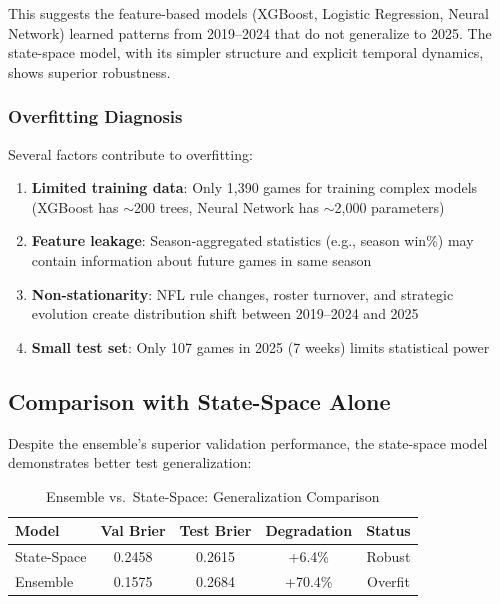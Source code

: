 This suggests the feature-based models (XGBoost, Logistic Regression, Neural Network) learned patterns from 2019--2024 that do not generalize to 2025. The state-space model, with its simpler structure and explicit temporal dynamics, shows superior robustness.

\subsubsection{Overfitting Diagnosis}

Several factors contribute to overfitting:

\begin{enumerate}
    \item \textbf{Limited training data}: Only 1,390 games for training complex models (XGBoost has $\sim$200 trees, Neural Network has $\sim$2,000 parameters)
    \item \textbf{Feature leakage}: Season-aggregated statistics (e.g., season win\%) may contain information about future games in same season
    \item \textbf{Non-stationarity}: NFL rule changes, roster turnover, and strategic evolution create distribution shift between 2019--2024 and 2025
    \item \textbf{Small test set}: Only 107 games in 2025 (7 weeks) limits statistical power
\end{enumerate}

\subsection{Comparison with State-Space Alone}

Despite the ensemble's superior validation performance, the state-space model demonstrates better test generalization:

\begin{table}[htbp]
\centering
\caption{Ensemble vs.\ State-Space: Generalization Comparison}
\label{tab:ensemble-vs-state-space-generalization}
\begin{tabular}{lcccc}
\toprule
\textbf{Model} & \textbf{Val Brier} & \textbf{Test Brier} & \textbf{Degradation} & \textbf{Status} \\
\midrule
State-Space & 0.2458 & 0.2615 & +6.4\% & Robust \\
Ensemble & 0.1575 & 0.2684 & +70.4\% & Overfit \\
\bottomrule
\end{tabular}
\end{table}

